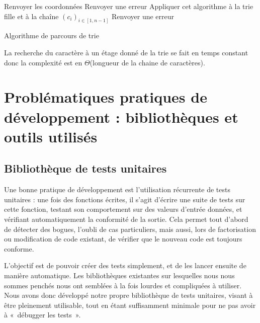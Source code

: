 \documentclass[a4paper]{article}
\begin{document}
\medskip

\begin{algorithm}[H]
  \SetAlgoLined
   {
     {
       {
        Renvoyer les coordonnées\;
      }{
        Renvoyer une erreur\;
      }
    }{
      Appliquer cet algorithme à la trie fille et à la chaîne $(c_i)_{i \in [1,n-1]}$ \;
    }
  }{
    Renvoyer une erreur\;
  }
\caption{Algorithme de parcours de trie}
\end{algorithm}

\medskip

La recherche du caractère à un étage donné de la trie se fait en temps constant donc la complexité est en $\Theta$(longueur de la chaine de caractères).

\section{Problématiques pratiques de développement : bibliothèques et outils utilisés}

\subsection{Bibliothèque de tests unitaires}
Une bonne pratique de développement est l'utilisation récurrente de tests unitaires : une fois des fonctions écrites, il s'agit d'écrire une suite de tests sur cette fonction, testant son comportement sur des valeurs d'entrée données, et vérifiant automatiquement la conformité de la sortie. Cela permet tout d'abord de détecter des bogues, l'oubli de cas particuliers, mais aussi, lors de factorisation ou modification de code existant, de vérifier que le nouveau code est toujours conforme.

L'objectif est de pouvoir créer des tests simplement, et de les lancer ensuite de manière automatique. Les bibliothèques existantes sur lesquelles nous nous sommes penchés nous ont semblées à la fois lourdes et compliquées à utiliser. Nous avons donc développé notre propre bibliothèque de tests unitaires, visant à être pleinement utilisable, tout en étant suffisamment minimale pour ne pas avoir à «~débugger les tests~».
\end{document}
